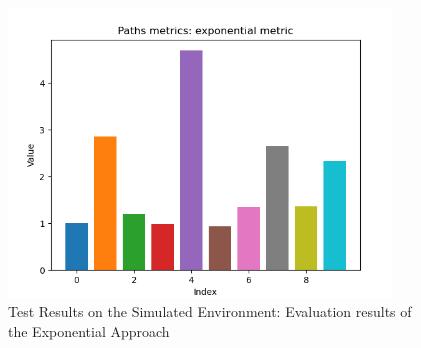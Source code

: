 \begin{figure}[H]
    \begin{center}
        \includegraphics[width=4in]{images/Chap2/Exp_Results.png} %
        \caption{Test Results on the Simulated Environment: Evaluation results of the Exponential Approach}
        \label{Test_Eval_Exp}
        \end{center}    
\end{figure}

